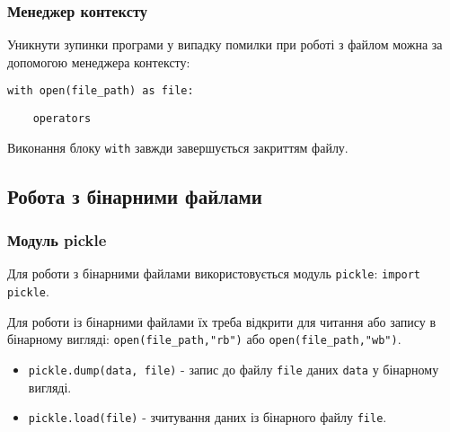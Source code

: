 \begin{frame}
\frametitle{Менеджер контексту}
Уникнути зупинки програми у випадку помилки при роботі з файлом можна за допомогою менеджера контексту:

\vspace{0.5cm}

\Large
\texttt{with open(file\_path) as file:}

\texttt{~~~~operators}

\vspace{0.5cm}
\normalsize
Виконання блоку \texttt{with} завжди завершується закриттям файлу.

\end{frame}

\subsection{Робота з бінарними файлами}
\begin{frame}
\frametitle{Модуль pickle}
Для роботи з бінарними файлами використовується модуль \texttt{pickle}: \texttt{import pickle}.

Для роботи із бінарними файлами їх треба відкрити для читання або запису в бінарному вигляді:
\texttt{open(file\_path,"rb")} або  \texttt{open(file\_path,"wb")}.

\begin{itemize}
  \item \texttt{pickle.dump(data, file)} - запис до файлу \texttt{file} даних \texttt{data} у бінарному вигляді.
  \item  \texttt{pickle.load(file)} - зчитування даних із бінарного файлу \texttt{file}.
\end{itemize}

\end{frame}
